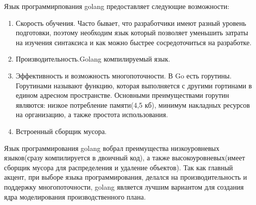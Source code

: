 Язык программирпования golang предоставляет следующие возможности:

\begin{enumerate}
    \item Скорость обучения. Часто бывает, что разработчики имеют разный уровень подготовки, поэтому необходим язык который позволяет уменьшить затраты на изучения синтаксиса и как можно быстрее сосредоточиться на разработке. 
    \item Производительность.Golang компилируемый язык. 
    \item Эффективность и возможность многопоточности. В Go есть горутины. Горутинами называют функцию, которая выполняется с другими гортинами в едином адресном пространстве. Основными преимуществами горутин являются: низкое потребление памяти(4,5 кб), минимум накладных ресурсов на организацию, а также простота использования.
    \item Встроенный сборщик мусора.
\end{enumerate}

Язык программирования golang вобрал преимущества низкоуровневых языков(сразу компилируется в двоичный код), а также высокоуровневых(имеет сборщик мусора для распределения и удаление объектов). Так как главный акцент, при выборе языка программирования, делался на производительность и поддержку многопоточности, golang является лучшим вариантом для создания ядра моделирования производственного плана.